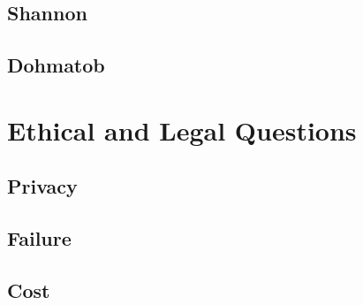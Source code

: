 \subsection{Shannon}
\lipsum[1-3]
\subsection{Dohmatob}
\lipsum[1-3]

\section{Ethical and Legal Questions}
\lipsum[1-3]
\subsection{Privacy}
\lipsum[1-3]
\subsection{Failure}
\lipsum[1-3]
\subsection{Cost}
\lipsum[1-3]